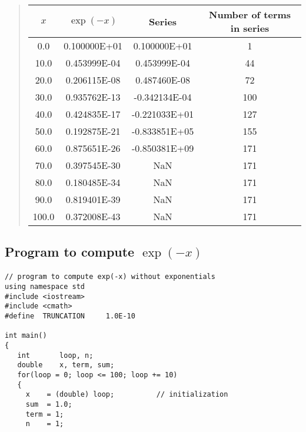 \documentclass[%
oneside,                 %
final,                   %
10pt]{article}
\begin{document}
\begin{quote}
\begin{tabular}{cccc}
\hline
\multicolumn{1}{c}{ $x$ } & \multicolumn{1}{c}{ $\exp{(-x)}$ } & \multicolumn{1}{c}{ Series } & \multicolumn{1}{c}{ Number of terms in series } \\
\hline
0.0   & 0.100000E+01 & 0.100000E+01  & 1                         \\
10.0  & 0.453999E-04 & 0.453999E-04  & 44                        \\
20.0  & 0.206115E-08 & 0.487460E-08  & 72                        \\
30.0  & 0.935762E-13 & -0.342134E-04 & 100                       \\
40.0  & 0.424835E-17 & -0.221033E+01 & 127                       \\
50.0  & 0.192875E-21 & -0.833851E+05 & 155                       \\
60.0  & 0.875651E-26 & -0.850381E+09 & 171                       \\
70.0  & 0.397545E-30 & NaN           & 171                       \\
80.0  & 0.180485E-34 & NaN           & 171                       \\
90.0  & 0.819401E-39 & NaN           & 171                       \\
100.0 & 0.372008E-43 & NaN           & 171                       \\
\hline
\end{tabular}
\end{quote}

\noindent




\subsection*{Program to compute $\exp{(-x)}$}


\paragraph{}
\begin{verbatim}
// program to compute exp(-x) without exponentials
using namespace std
#include <iostream>
#include <cmath>
#define  TRUNCATION     1.0E-10

int main()
{
   int       loop, n;
   double    x, term, sum;
   for(loop = 0; loop <= 100; loop += 10)
   {
     x    = (double) loop;          // initialization
     sum  = 1.0;
     term = 1;
     n    = 1;
\end{verbatim}
\end{document}
